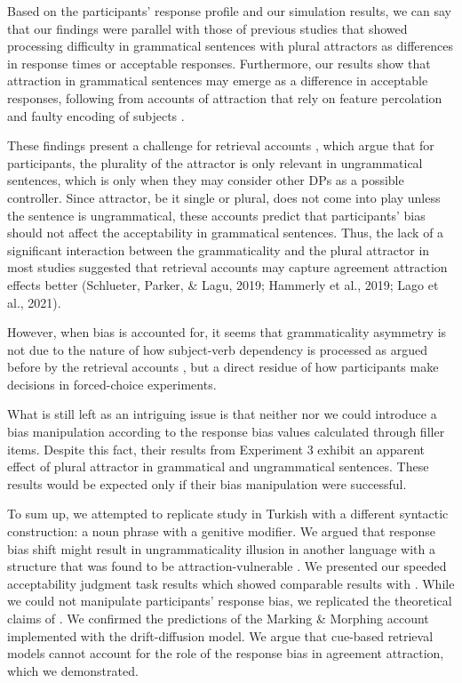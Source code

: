 Based on the participants' response profile and our simulation results, we can say that our findings were parallel with those of previous studies that showed processing difficulty in grammatical sentences with plural attractors as differences in response times or acceptable responses.
Furthermore, our results show that attraction in grammatical sentences may emerge as a difference in acceptable responses, following from accounts of attraction that rely on feature percolation and faulty encoding of subjects \citep[][among others]{EberhardEtAl2005}.

These findings present a challenge for retrieval accounts \citep{LagoEtAl2015, LagoEtAl2019, WagersEtAl:2009}, which argue that for participants, the plurality of the attractor is only relevant in ungrammatical sentences, which is only when they may consider other DPs as a possible controller. 
Since attractor, be it single or plural, does not come into play unless the sentence is ungrammatical, these accounts predict that participants' bias should not affect the acceptability in grammatical sentences. 
Thus, the lack of a significant interaction between the grammaticality and the plural attractor in most studies suggested that retrieval accounts may capture agreement attraction effects better (Schlueter, Parker, \& Lagu, 2019; Hammerly et al., 2019; Lago et al., 2021). 

However, when bias is accounted for, it seems that grammaticality asymmetry is not due to the nature of how subject-verb dependency is processed as argued before by the retrieval accounts \citep[][among others]{WagersEtAl:2009}, but a direct residue of how participants make decisions in forced-choice experiments. 

What is still left as an intriguing issue is that neither  nor we could introduce a bias manipulation according to the response bias values calculated through filler items. Despite this fact, their results from Experiment 3 exhibit an apparent effect of plural attractor in grammatical and ungrammatical sentences. These results would be expected only if their bias manipulation were successful.

To sum up, we attempted to replicate \cites{HammerlyEtAl2019} study in Turkish with a different syntactic construction: a noun phrase with a genitive modifier. We argued that response bias shift might result in ungrammaticality illusion in another language with a structure that was found to be attraction-vulnerable \citep{LagoEtAl2015}. We presented our speeded acceptability judgment task results which showed comparable results with . While we could not manipulate participants' response bias, we replicated the theoretical claims of . We confirmed the predictions of the Marking \& Morphing account implemented with the drift-diffusion model. We argue that cue-based retrieval models cannot account for the role of the response bias in agreement attraction, which we demonstrated. 
